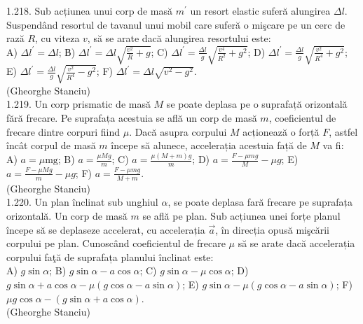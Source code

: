 {1.218. Sub acțiunea unui corp de masă $m^{\prime}$ un resort elastic suferă alungirea $\Delta l$. Suspendând resortul de tavanul unui mobil care suferă o mişcare pe un cerc de rază $R$, cu viteza $v$, să se arate dacă alungirea resortului este:\\ A) $\Delta l^{\prime}=\Delta l$; В) $\Delta l^{\prime}=\Delta l \sqrt{\frac{v^{2}}{R}+g}$; C) $\Delta l^{\prime}=\frac{\Delta l}{g} \sqrt{\frac{v^{4}}{R^{2}}+g^{2}}$; D) $\Delta l^{\prime}=\frac{\Delta l}{g} \sqrt{\frac{v^{2}}{R^{4}}+g^{2}}$; E) $\Delta l^{\prime}=\frac{\Delta l}{g} \sqrt{\frac{v^{2}}{R^{4}}-g^{2}}$; F) $\Delta l^{\prime}=\Delta l \sqrt{v^{2}-g^{2}}$.\\ (Gheorghe Stanciu)\\

1.219. Un corp prismatic de masă $M$ se poate deplasa pe o suprafață orizontală fără frecare. Pe suprafața acestuia se află un corp de masă $m$, coeficientul de frecare dintre corpuri fiind $\mu$. Dacă asupra corpului $M$ acționează o forță $F$, astfel încât corpul de masă $m$ începe să alunece, accelerația acestuia față de $M$ va fi:\\ A) $a=\mu \mathrm{mg}$; B) $a=\frac{\mu M g}{m}$; C) $a=\frac{\mu(M+m) g}{m}$; D) $a=\frac{F-\mu m g}{M}-\mu g$; E) $a=\frac{F-\mu M g}{m}-\mu g$; F) $a=\frac{F-\mu m g}{M+m}$.\\ (Gheorghe Stanciu)\\

1.220. Un plan înclinat sub unghiul $\alpha$, se poate deplasa fară frecare pe suprafața orizontală. Un corp de masă $m$ se află pe plan. Sub acțiunea unei forțe planul începe să se deplaseze accelerat, cu accelerația $\vec{a}$, în direcția opusă mişcării corpului pe plan. Cunoscând coeficientul de frecare $\mu$ să se arate dacă accelerația corpului faţă de suprafața planului înclinat este:\\ A) $g \sin \alpha$; B) $g \sin \alpha-a \cos \alpha$; C) $g \sin \alpha-\mu \cos \alpha$; D) $g \sin \alpha+a \cos \alpha-\mu(g \cos \alpha-a \sin \alpha)$; E) $g \sin \alpha-\mu(g \cos \alpha-a \sin \alpha)$; F) $\mu g \cos \alpha-(g \sin \alpha+a \cos \alpha)$.\\ (Gheorghe Stanciu)\\

}
